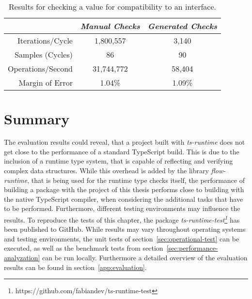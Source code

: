 \begin{table}[ht]
\begin{subtable}[ht]{1.0\textwidth}
    \setlength{\tabcolsep}{5mm}
    \def\arraystretch{1.25}
    \centering
    \begin{tabular}{|r||c|c|}
      \hline
      & \emph{Manual Checks} & \emph{Generated Checks} \\
      \hline
      \hline
      Iterations/Cycle & 1,800,557 & 3,140 \\
      \hline
      Samples (Cycles) & 86 & 90 \\
      \hline
      Operations/Second & 31,744,772 & 58,404 \\
      \hline
      Margin of Error & 1.04\% & 1.09\% \\
      \hline
    \end{tabular}
    \caption{Results for checking a value for compatibility to an interface.}
    \label{tab:benchmarks:interface}
  \end{subtable}
\end{table}

\section{Summary}
\label{sec:evaluation-summary}

The evaluation results could reveal, that a project built with \emph{ts-runtime} does not get close to the performance of a standard TypeScript build. This is due to the inclusion of a runtime type system, that is capable of reflecting and verifying complex data structures. While this overhead is added by the library \emph{flow-runtime}, that is being used for the runtime type checks itself, the performance of building a package with the project of this thesis performs close to building with the native TypeScript compiler, when considering the additional tasks that have to be performed. Furthermore, different testing environments may influence the results. To reproduce the tests of this chapter, the package \emph{ts-runtime-test\footnote{https://github.com/fabiandev/ts-runtime-test}} has been published to GitHub. While results may vary throughout operating systems and testing environments, the unit tests of section~\ref{sec:operational-test} can be executed, as well as the benchmark tests from section~\ref{sec:performance-analyzation} can be run locally. Furthermore a detailed overview of the evaluation results can be found in section~\ref{app:evaluation}.
